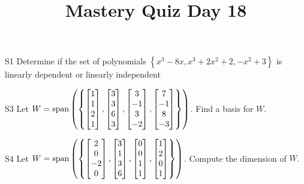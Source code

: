 \documentclass{sbgLAquiz}
\title{Mastery Quiz Day 18 }
\begin{document}
\begin{problem}{S1}
Determine if the set of polynomials $\left\{ x^3-8x, x^3+2x^2+2, -x^2+3\right\}$ is  linearly dependent or linearly independent
\end{problem}

\begin{problem}{S3}
Let $W = {\rm span} \left( \left\{ \begin{bmatrix} 1 \\ 1 \\ 2 \\ 1 \end{bmatrix}, \begin{bmatrix} 3 \\ 3 \\ 6 \\ 3 \end{bmatrix}, \begin{bmatrix} 3 \\ -1 \\ 3 \\ -2 \end{bmatrix}, \begin{bmatrix} 7 \\ -1 \\ 8 \\ -3 \end{bmatrix} \right\} \right)$.  Find a basis for $W$.
\end{problem}
\newpage

\begin{problem}{S4}
Let $W={\rm span}\left(\left\{\begin{bmatrix} 2 \\ 0 \\ -2 \\ 0 \end{bmatrix}, \begin{bmatrix} 3 \\ 1 \\ 3 \\ 6 \end{bmatrix}, \begin{bmatrix} 0 \\ 0 \\ 1 \\ 1 \end{bmatrix}, \begin{bmatrix}1 \\ 2 \\ 0 \\ 1 \end{bmatrix}\right\}\right)$. Compute the dimension of $W$.
\end{problem}
\end{document}
